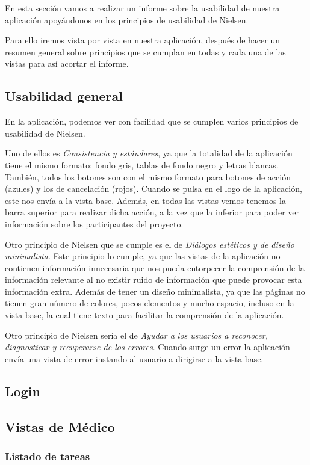 En esta sección vamos a realizar un informe sobre la usabilidad de nuestra aplicación apoyándonos en los principios de usabilidad de Nielsen.

Para ello iremos vista por vista en nuestra aplicación, después de hacer un resumen general sobre principios que se cumplan en todas y cada una de las vistas para así acortar el informe.
\subsection{Usabilidad general}
En la aplicación, podemos ver con facilidad que se cumplen varios principios de usabilidad de Nielsen.

Uno de ellos es \textit{Consistencia y estándares}, ya que la totalidad de la aplicación tiene el mismo formato: fondo gris, tablas de fondo negro y letras blancas. También, todos los botones son con el mismo formato para botones de acción (azules) y los de cancelación (rojos). 
Cuando se pulsa en el logo de la aplicación, este nos envía a la vista base. Además, en todas las vistas vemos tenemos la barra superior para realizar dicha acción, a la vez que la inferior para poder ver información sobre los participantes del proyecto.

Otro principio de Nielsen que se cumple es el de \textit{Diálogos estéticos y de diseño minimalista}. Este principio lo cumple, ya que las vistas de la aplicación no contienen información innecesaria que nos pueda entorpecer la comprensión de la
información relevante al no existir ruido de información que puede provocar esta
información extra. Además de tener un diseño minimalista, ya que las páginas no tienen
gran número de colores, pocos elementos y mucho espacio, incluso en la vista base, la cual tiene texto para facilitar la comprensión de la aplicación.

Otro principio de Nielsen sería el de \textit{Ayudar a los usuarios a reconocer, diagnosticar y recuperarse de los errores}. Cuando
surge un error la aplicación envía una vista de error instando al usuario a dirigirse a la vista base.

\subsection{Login}
\subsection{Vistas de Médico}
\subsubsection{Listado de tareas}
